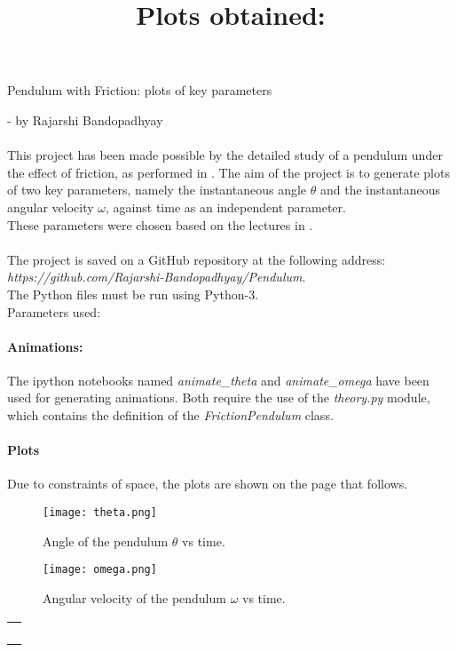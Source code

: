 \documentclass{article}
\begin{document}

\begin{Large} Pendulum with Friction: plots of key parameters \end{Large}
\begin{flushright}
- by Rajarshi Bandopadhyay
\end{flushright}

\paragraph{}
This project has been made possible by the detailed study of a pendulum under the effect of friction, as performed in \cite{theory}. The aim of the project is to generate plots of two key parameters, namely the instantaneous angle $\theta$ and the instantaneous angular velocity $\omega$, against time as an independent parameter. \\
These parameters were chosen based on the lectures in \cite{feynman}.

\paragraph{}
The project is saved on a GitHub repository at the following address: \\
\textit{https://github.com/Rajarshi-Bandopadhyay/Pendulum}. \\
The Python files must be run using Python-3. \\
Parameters used: 

\paragraph{Animations:}
The ipython notebooks named \textit{animate\_theta} and \textit{animate\_omega} have been used for generating animations. Both require the use of the \textit{theory.py} module, which contains the definition of the \textit{FrictionPendulum} class.

\paragraph{Plots}
Due to constraints of space, the plots are shown on the page that follows.

\pagebreak
\begin{figure}[t]
\title{Plots obtained:}

\texttt{[image: theta.png]} 
\caption{Angle of the pendulum $\theta$ vs time.}

\texttt{[image: omega.png]}
\caption{Angular velocity of the pendulum $\omega$ vs time.}
\end{figure}

\begin{tabular}{c}
 \\
 \\
 \\
 \\
 \\
\end{tabular}


\end{document}
